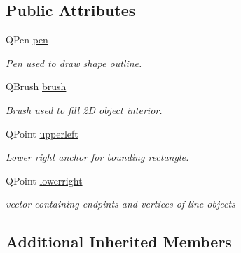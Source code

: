 \subsection*{Public Attributes}
\begin{DoxyCompactItemize}
\item 
\hypertarget{classShape2D_a703b6a05045fdfdd01a362fe80c6db73}{Q\-Pen \hyperlink{classShape2D_a703b6a05045fdfdd01a362fe80c6db73}{pen}}\label{classShape2D_a703b6a05045fdfdd01a362fe80c6db73}

\begin{DoxyCompactList}\small\item\em Pen used to draw shape outline. \end{DoxyCompactList}\item 
\hypertarget{classShape2D_ad2a39e54a4cce0f95547225ad6282f54}{Q\-Brush \hyperlink{classShape2D_ad2a39e54a4cce0f95547225ad6282f54}{brush}}\label{classShape2D_ad2a39e54a4cce0f95547225ad6282f54}

\begin{DoxyCompactList}\small\item\em Brush used to fill 2\-D object interior. \end{DoxyCompactList}\item 
\hypertarget{classShape2D_a04ff6cd950715ef89ecea1d4004e2cab}{Q\-Point \hyperlink{classShape2D_a04ff6cd950715ef89ecea1d4004e2cab}{upperleft}}\label{classShape2D_a04ff6cd950715ef89ecea1d4004e2cab}

\begin{DoxyCompactList}\small\item\em Lower right anchor for bounding rectangle. \end{DoxyCompactList}\item 
\hypertarget{classShape2D_ac09b295b11d1668f6c696ac8480e9466}{Q\-Point \hyperlink{classShape2D_ac09b295b11d1668f6c696ac8480e9466}{lowerright}}\label{classShape2D_ac09b295b11d1668f6c696ac8480e9466}

\begin{DoxyCompactList}\small\item\em vector containing endpints and vertices of line objects \end{DoxyCompactList}\end{DoxyCompactItemize}
\subsection*{Additional Inherited Members}


